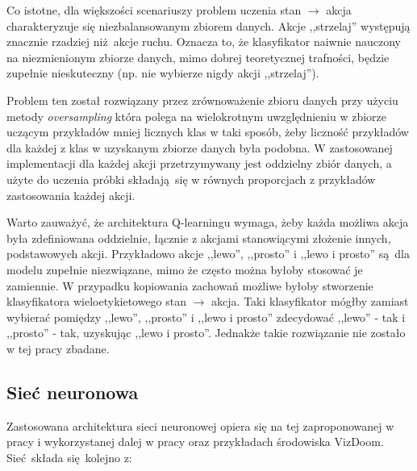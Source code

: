 Co istotne, dla większości scenariuszy problem uczenia stan $\to$ akcja charakteryzuje się niezbalansowanym zbiorem danych. Akcje ,,strzelaj'' występują znacznie rzadziej niż akcje ruchu. Oznacza to, że klasyfikator naiwnie nauczony na niezmienionym zbiorze danych, mimo dobrej teoretycznej trafności, będzie zupełnie nieskuteczny (np. nie wybierze nigdy akcji ,,strzelaj'').

Problem ten został rozwiązany przez zrównoważenie zbioru danych przy użyciu metody \textit{oversampling} która polega na wielokrotnym uwzględnieniu w zbiorze uczącym przykładów mniej licznych klas w taki sposób, żeby liczność przykładów dla każdej z klas w uzyskanym zbiorze danych była podobna. W zastosowanej implementacji dla każdej akcji przetrzymywany jest oddzielny zbiór danych, a użyte do uczenia próbki składają się w równych proporcjach z przykładów zastosowania każdej akcji. 

Warto zauważyć, że architektura Q-learningu wymaga, żeby każda możliwa akcja była zdefiniowana oddzielnie, łącznie z akcjami stanowiącymi złożenie innych, podstawowych akcji. Przykładowo akcje ,,lewo'', ,,prosto'' i ,,lewo i prosto'' są dla modelu zupełnie niezwiązane, mimo że często można byłoby stosować je zamiennie. W przypadku kopiowania zachowań możliwe byłoby stworzenie klasyfikatora  wieloetykietowego stan $\to$ akcja. Taki klasyfikator mógłby zamiast wybierać pomiędzy ,,lewo'', ,,prosto'' i ,,lewo i prosto'' zdecydować ,,lewo'' - tak i ,,prosto'' - tak, uzyskując ,,lewo i prosto''. Jednakże takie rozwiązanie nie zostało w tej pracy zbadane.


\subsection{Sieć neuronowa}\label{agent_net}

Zastosowana architektura sieci neuronowej opiera się na tej zaproponowanej w pracy \break \cite{mnih2015human} i wykorzystanej dalej w pracy  \cite{DBLP:journals/corr/KempkaWRTJ16} oraz przykładach środowiska VizDoom. Sieć składa się kolejno z:

